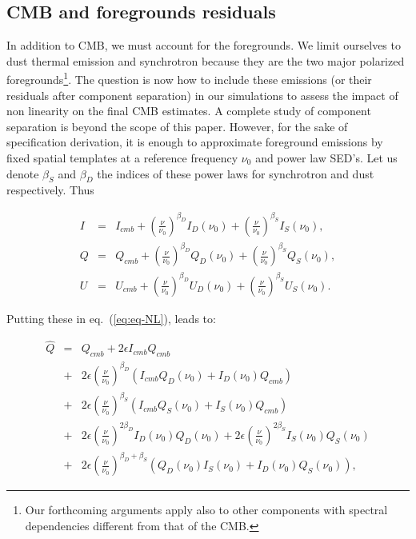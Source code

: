 \subsection{CMB and foregrounds residuals}


\noindent In addition to CMB, we must account for the foregrounds. We limit ourselves to
dust thermal emission and synchrotron because they are the two major polarized
foregrounds\footnote{Our forthcoming arguments apply also to other components
  with spectral dependencies different from that of the CMB.}. The question is
now how to include these emissions (or their residuals after component
separation) in our simulations to assess the impact of non linearity on the
final CMB estimates. A complete study of component separation is beyond the
scope of this paper. However, for the sake of specification derivation, it is
enough to approximate foreground emissions by fixed spatial templates at a
reference frequency $\nu_0$ and power law SED's. Let us denote $\beta_S$ and
$\beta_D$ the indices of these power laws for synchrotron and dust
respectively. Thus

\begin{eqnarray}
I&=&I_{cmb} + \left(\frac{\nu}{\nu_0}\right)^{\beta_D}I_D(\nu_0) +
\left(\frac{\nu}{\nu_0}\right)^{\beta_S}I_S(\nu_0), \\
Q&=&Q_{cmb} + \left(\frac{\nu}{\nu_0}\right)^{\beta_D}Q_D(\nu_0) +
\left(\frac{\nu}{\nu_0}\right)^{\beta_S}Q_S(\nu_0), \\
U&=&U_{cmb} + \left(\frac{\nu}{\nu_0}\right)^{\beta_D}U_D(\nu_0) +
\left(\frac{\nu}{\nu_0}\right)^{\beta_S}U_S(\nu_0).
\end{eqnarray}

\noindent Putting these in eq.~(\ref{eq:eq-NL}), leads to:

\begin{eqnarray}
\hat{Q} &=& Q_{cmb} + 2\epsilon I_{cmb}Q_{cmb} \nonumber\\
&+&
2\epsilon\left(\frac{\nu}{\nu_0}\right)^{\beta_D}\left(I_{cmb}Q_D(\nu_0)+I_D(\nu_0)Q_{cmb}\right)\nonumber\\
&+&2\epsilon\left(\frac{\nu}{\nu_0}\right)^{\beta_S}\left(I_{cmb}Q_S(\nu_0)+I_S(\nu_0)Q_{cmb}\right) \nonumber\\
&+&2\epsilon\left(\frac{\nu}{\nu_0}\right)^{2\beta_D}I_D(\nu_0)Q_D(\nu_0) +
2\epsilon\left(\frac{\nu}{\nu_0}\right)^{2\beta_S}I_S(\nu_0)Q_S(\nu_0)\nonumber\\
&+&2\epsilon\left(\frac{\nu}{\nu_0}\right)^{\beta_D+\beta_S}\left(Q_D(\nu_0)I_S(\nu_0)+I_D(\nu_0)Q_S(\nu_0)\right),
\end{eqnarray}

